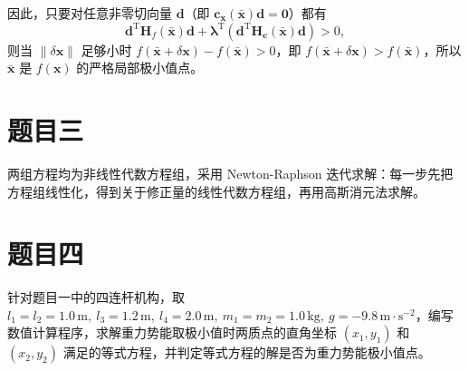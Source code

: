 \documentclass[fontset=fandol,12pt,a4paper]{ctexart}
\begin{document}
因此，只要对任意非零切向量 $\boldsymbol{d}$（即 $\boldsymbol{c}_{\boldsymbol{x}}(\bar{\boldsymbol{x}}) \boldsymbol{d}=\mathbf{0}$）都有
\[
	\boldsymbol{d}^{\mathrm{T}} \boldsymbol{H}_{f}(\bar{\boldsymbol{x}}) \boldsymbol{d}
	+ \boldsymbol{\lambda}^{\mathrm{T}}\left(\boldsymbol{d}^{\mathrm{T}} \boldsymbol{H}_{\boldsymbol{c}}(\bar{\boldsymbol{x}}) \boldsymbol{d}\right)>0 ,
\]
则当 $\|\delta \boldsymbol{x}\|$ 足够小时 $f(\bar{\boldsymbol{x}}+\delta \boldsymbol{x})-f(\bar{\boldsymbol{x}})>0$，即 $f(\bar{\boldsymbol{x}}+\delta \boldsymbol{x})>f(\bar{\boldsymbol{x}})$，所以 $\bar{\boldsymbol{x}}$ 是 $f(\boldsymbol{x})$ 的严格局部极小值点。


\newpage
\section{题目三}
两组方程均为非线性代数方程组，采用 Newton-Raphson 迭代求解：每一步先把方程组线性化，得到关于修正量的线性代数方程组，再用高斯消元法求解。




\newpage
\section{题目四}
针对题目一中的四连杆机构，取 $l_1=l_2=1.0\,\mathrm{m},\ l_3=1.2\,\mathrm{m},\ l_4=2.0\,\mathrm{m},\ m_1=m_2=1.0\,\mathrm{kg},\ g=-9.8\,\mathrm{m}\cdot\mathrm{s}^{-2}$，编写数值计算程序，求解重力势能取极小值时两质点的直角坐标 $(x_1,y_1)$ 和 $(x_2,y_2)$ 满足的等式方程，并判定等式方程的解是否为重力势能极小值点。
\end{document}
